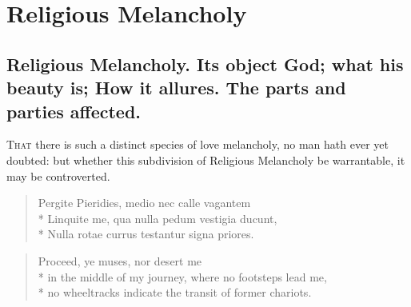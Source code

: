 \chapter{Religious Melancholy}\label{ch:religious-melancholy}
{

\section[Religious Melancholy, its object God]{Religious Melancholy. Its object God; what his beauty is; How it allures. The parts and parties affected.}

\lettrine{T}{hat} there is such a distinct species of love melancholy, no man hath
ever yet doubted: but whether this subdivision of Religious
Melancholy be warrantable, it may be controverted.


\begin{latin}
\begin{verse}
Pergite Pieridies, medio nec calle vagantem\\*
Linquite me, qua nulla pedum vestigia ducunt,\\*
Nulla rotae currus testantur signa priores.
\end{verse}
\end{latin}

\begin{verse}
Proceed, ye muses, nor desert me\\*
in the middle of my journey, where no footsteps lead me,\\*
no wheeltracks indicate the transit of former chariots.
\end{verse}

}
